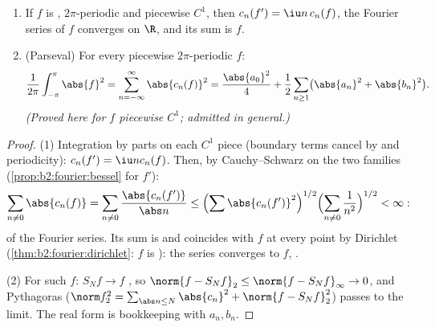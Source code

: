 \begin{theorem}\label{thm:b2:fourier:parseval}
\begin{enumerate}
  \item If $f$ is , $2\pi$-periodic and piecewise $C^1$,
        then $c_n(f') = \iu n\,c_n(f)$, the Fourier series of $f$
        converges \emph{} on $\R$, and its sum is $f$.
  \item (Parseval) For every piecewise  $2\pi$-periodic
        $f$:
        \[
        \frac{1}{2\pi}\int_{-\pi}^{\pi}\abs{f}^2
        = \sum_{n=-\infty}^{\infty} \abs{c_n(f)}^2
        = \frac{\abs{a_0}^2}{4} + \frac12\sum_{n\geq1}
        \bigl(\abs{a_n}^2 + \abs{b_n}^2\bigr).
        \]
        \emph{(Proved here for $f$  piecewise $C^1$;
        admitted in general.)}
\end{enumerate}
\end{theorem}

\begin{proof}
(1) Integration by parts on each $C^1$ piece (boundary terms cancel
by  and periodicity): $c_n(f') = \iu n c_n(f)$. Then, by
Cauchy--Schwarz on the two  families
(\cref{prop:b2:fourier:bessel} for $f'$):
\[
\sum_{n \neq 0} \abs{c_n(f)} = \sum_{n\neq0}
\frac{\abs{c_n(f')}}{\abs n}
\leq \Bigl(\sum \abs{c_n(f')}^2\Bigr)^{1/2}
\Bigl(\sum_{n\neq0}\frac{1}{n^2}\Bigr)^{1/2} < \infty :
\]
 of the Fourier series. Its sum is  and
coincides with $f$ at every point by Dirichlet
(\cref{thm:b2:fourier:dirichlet}: $f$ is ): the series
converges to $f$, .

(2) For such $f$: $S_N f \to f$ , so $\norm{f - S_Nf}_2
\leq \norm{f - S_Nf}_\infty \to 0$, and Pythagoras
($\norm f_2^2 = \sum_{\abs n \leq N}\abs{c_n}^2 + \norm{f -
S_Nf}_2^2$) passes to the limit. The real form is bookkeeping with
$a_n, b_n$.
\end{proof}

